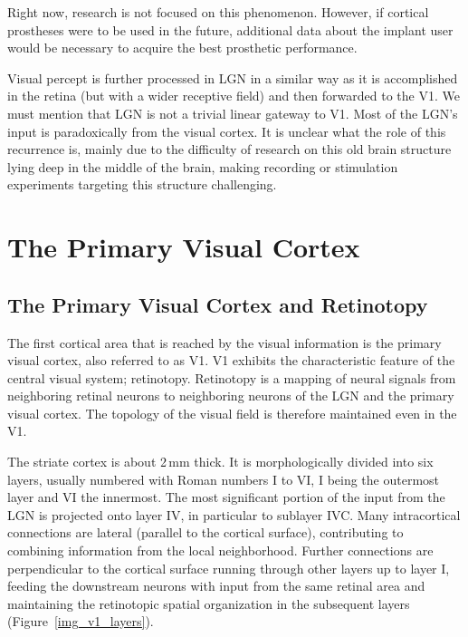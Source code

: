 Right now, research is not focused on this phenomenon. However, if cortical prostheses were to be used in the future, additional data about the implant user would be necessary to acquire the best prosthetic performance.

Visual percept is further processed in LGN in a similar way as it is accomplished in the retina (but with a wider receptive field) and then forwarded to the V1. We must mention that LGN is not a trivial linear gateway to V1. Most of the LGN’s input is paradoxically from the visual cortex. It is unclear what the role of this recurrence is, mainly due to the difficulty of research on this old brain structure lying deep in the middle of the brain, making recording or stimulation experiments targeting this structure challenging. 


\section{The Primary Visual Cortex}

\subsection{The Primary Visual Cortex and Retinotopy}\label{retinotopy}

The first cortical area that is reached by the visual information is the primary visual cortex, also referred to as V1. V1 exhibits the characteristic feature of the central visual system; retinotopy. Retinotopy is a mapping of neural signals from neighboring retinal neurons to neighboring neurons of the LGN and the primary visual cortex. The topology of the visual field is therefore maintained even in the V1.

The striate cortex is about 2\,mm thick. It is morphologically divided into six layers, usually numbered with Roman numbers I to VI, I being the outermost layer and VI the innermost. The most significant portion of the input from the LGN is projected onto layer IV, in particular to sublayer IVC. Many intracortical connections are lateral (parallel to the cortical surface), contributing to combining information from the local neighborhood. Further connections are perpendicular to the cortical surface running through other layers up to layer I, feeding the downstream neurons with input from the same retinal area and maintaining the retinotopic spatial organization in the subsequent layers (Figure~\ref{img_v1_layers}).


